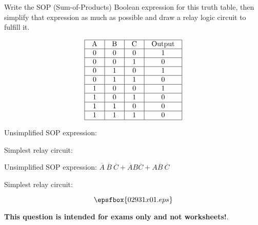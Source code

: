 

Write the SOP (Sum-of-Products) Boolean expression for this truth table, then simplify that expression as much as possible and draw a relay logic circuit to fulfill it.


$$\vbox{\offinterlineskip
\halign{\strut
\vrule \quad\hfil # \ \hfil & 
\vrule \quad\hfil # \ \hfil & 
\vrule \quad\hfil # \ \hfil & 
\vrule \quad\hfil # \ \hfil \vrule \cr
\noalign{\hrule}
%
A & B & C & Output \cr
%
\noalign{\hrule}
%
0 & 0 & 0 & 1 \cr
%
\noalign{\hrule}
%
0 & 0 & 1 & 0 \cr
%
\noalign{\hrule}
%
0 & 1 & 0 & 1 \cr
%
\noalign{\hrule}
%
0 & 1 & 1 & 0 \cr
%
\noalign{\hrule}
%
1 & 0 & 0 & 1 \cr
%
\noalign{\hrule}
%
1 & 0 & 1 & 0 \cr
%
\noalign{\hrule}
%
1 & 1 & 0 & 0 \cr
%
\noalign{\hrule}
%
1 & 1 & 1 & 0 \cr
%
\noalign{\hrule}
} %
}$$ %

Unsimplified SOP expression:

\vskip 10pt

Simplest relay circuit:







Unsimplified SOP expression: $\overline{A} \> \overline{B} \> \overline{C} + \overline{A}B\overline{C} + A \overline{B} \> \overline{C}$

\vskip 10pt

Simplest relay circuit:

$$\epsfbox{02931x01.eps}$$







{\bf This question is intended for exams only and not worksheets!}.




